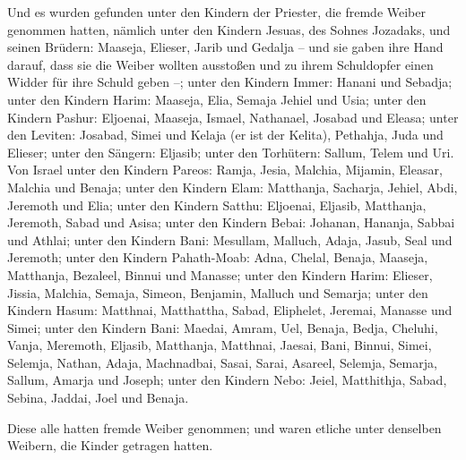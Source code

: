  Und es wurden gefunden unter den Kindern der Priester, die
fremde Weiber genommen hatten, nämlich unter den Kindern Jesuas, des
Sohnes Jozadaks, und seinen Brüdern: Maaseja, Elieser, Jarib und Gedalja
 -- und sie gaben ihre Hand darauf, dass sie die Weiber
wollten ausstoßen und zu ihrem Schuldopfer einen Widder für ihre Schuld
geben --;  unter den Kindern Immer: Hanani und Sebadja;
 unter den Kindern Harim: Maaseja, Elia, Semaja Jehiel und
Usia;  unter den Kindern Pashur: Eljoenai, Maaseja, Ismael,
Nathanael, Josabad und Eleasa;  unter den Leviten: Josabad,
Simei und Kelaja (er ist der Kelita), Pethahja, Juda und Elieser;
 unter den Sängern: Eljasib; unter den Torhütern: Sallum,
Telem und Uri.  Von Israel unter den Kindern Pareos: Ramja,
Jesia, Malchia, Mijamin, Eleasar, Malchia und Benaja; 
unter den Kindern Elam: Matthanja, Sacharja, Jehiel, Abdi, Jeremoth und
Elia;  unter den Kindern Satthu: Eljoenai, Eljasib,
Matthanja, Jeremoth, Sabad und Asisa;  unter den Kindern
Bebai: Johanan, Hananja, Sabbai und Athlai;  unter den
Kindern Bani: Mesullam, Malluch, Adaja, Jasub, Seal und Jeremoth;
 unter den Kindern Pahath-Moab: Adna, Chelal, Benaja,
Maaseja, Matthanja, Bezaleel, Binnui und Manasse;  unter
den Kindern Harim: Elieser, Jissia, Malchia, Semaja, Simeon,
 Benjamin, Malluch und Semarja;  unter den
Kindern Hasum: Matthnai, Matthattha, Sabad, Eliphelet, Jeremai, Manasse
und Simei;  unter den Kindern Bani: Maedai, Amram, Uel,
 Benaja, Bedja, Cheluhi,  Vanja, Meremoth,
Eljasib,  Matthanja, Matthnai, Jaesai,  Bani,
Binnui, Simei,  Selemja, Nathan, Adaja, 
Machnadbai, Sasai, Sarai,  Asareel, Selemja, Semarja,
 Sallum, Amarja und Joseph;  unter den Kindern
Nebo: Jeiel, Matthithja, Sabad, Sebina, Jaddai, Joel und Benaja.

 Diese alle hatten fremde Weiber genommen; und waren
etliche unter denselben Weibern, die Kinder getragen hatten.
